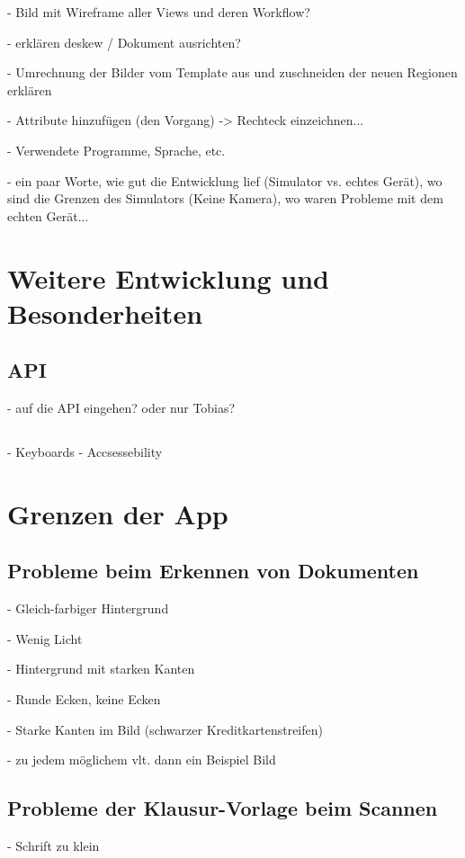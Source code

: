 \documentclass[nomenclature, oneside, 150]{HSMW-Thesis}
\begin{document}
	- Bild mit Wireframe aller Views und deren Workflow?
	
	- erklären deskew / Dokument ausrichten?
	
	- Umrechnung der Bilder vom Template aus und zuschneiden der neuen Regionen erklären
	
	- Attribute hinzufügen (den Vorgang) -> Rechteck einzeichnen...
	
	- Verwendete Programme, Sprache, etc. 
	
	- ein paar Worte, wie gut die Entwicklung lief (Simulator vs. echtes Gerät), wo sind die Grenzen des Simulators (Keine Kamera), wo waren Probleme mit dem echten Gerät...


\chapter{Weitere Entwicklung und Besonderheiten}
	
	\section{API}
		- auf die API eingehen? oder nur Tobias?
	
	\section{}
		- Keyboards
		- Accsessebility
		

\chapter{Grenzen der App}
	\section{Probleme beim Erkennen von Dokumenten}
		- Gleich-farbiger Hintergrund
			
		- Wenig Licht
		
		- Hintergrund mit starken Kanten
		
		- Runde Ecken, keine Ecken
		
		- Starke Kanten im Bild (schwarzer Kreditkartenstreifen)
		
		- zu jedem möglichem vlt. dann ein Beispiel Bild
		
	\section{Probleme der Klausur-Vorlage beim Scannen}
		- Schrift zu klein
		
\end{document}
